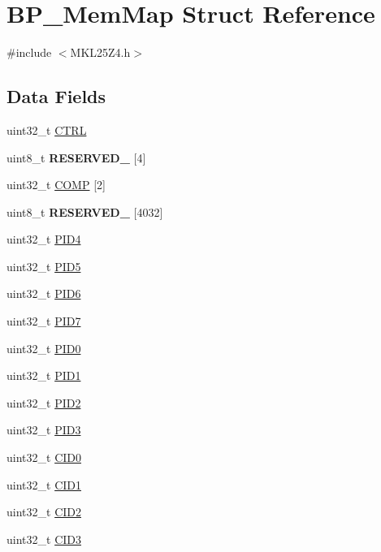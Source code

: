 \hypertarget{struct_b_p___mem_map}{}\section{B\+P\+\_\+\+Mem\+Map Struct Reference}
\label{struct_b_p___mem_map}


{\ttfamily \#include $<$M\+K\+L25\+Z4.\+h$>$}

\subsection*{Data Fields}
\begin{DoxyCompactItemize}
\item 
uint32\+\_\+t \hyperlink{struct_b_p___mem_map_a3be6514ca3bd369fd0de9f8f49471179}{C\+T\+R\+L}
\item 
\hypertarget{struct_b_p___mem_map_a71277aaa40be4473ac2521981f273bd3}{}uint8\+\_\+t {\bfseries R\+E\+S\+E\+R\+V\+E\+D\+\_} \mbox{[}4\mbox{]}\label{struct_b_p___mem_map_a71277aaa40be4473ac2521981f273bd3}

\item 
uint32\+\_\+t \hyperlink{struct_b_p___mem_map_afb7d1b290d30b9254c6975be8cfafbd7}{C\+O\+M\+P} \mbox{[}2\mbox{]}
\item 
\hypertarget{struct_b_p___mem_map_ac9276921ef84716eb43e5be528cf04e3}{}uint8\+\_\+t {\bfseries R\+E\+S\+E\+R\+V\+E\+D\+\_} \mbox{[}4032\mbox{]}\label{struct_b_p___mem_map_ac9276921ef84716eb43e5be528cf04e3}

\item 
uint32\+\_\+t \hyperlink{struct_b_p___mem_map_a4b742da36aa92236a876883d225769d9}{P\+I\+D4}
\item 
uint32\+\_\+t \hyperlink{struct_b_p___mem_map_a89a2228208ede3f7821c62acc24817e7}{P\+I\+D5}
\item 
uint32\+\_\+t \hyperlink{struct_b_p___mem_map_afbf6d9cf2860db9747fe2490f0a52bc9}{P\+I\+D6}
\item 
uint32\+\_\+t \hyperlink{struct_b_p___mem_map_a1658a67c3a52064ae611268d27ed5159}{P\+I\+D7}
\item 
uint32\+\_\+t \hyperlink{struct_b_p___mem_map_a769a58cfc13da35629a0e87f06abf754}{P\+I\+D0}
\item 
uint32\+\_\+t \hyperlink{struct_b_p___mem_map_a6e66209ba976b8d677c86ee05f0ee2fa}{P\+I\+D1}
\item 
uint32\+\_\+t \hyperlink{struct_b_p___mem_map_a8c56863ae2fd45dbee06b0ba0c7c17c7}{P\+I\+D2}
\item 
uint32\+\_\+t \hyperlink{struct_b_p___mem_map_acf224ed0d83cc1ae7b8492c6cd79e5dd}{P\+I\+D3}
\item 
uint32\+\_\+t \hyperlink{struct_b_p___mem_map_a46667149a1f5fa643ce1b5e7d55d85fb}{C\+I\+D0}
\item 
uint32\+\_\+t \hyperlink{struct_b_p___mem_map_afafacc56ceb45f360e2f940ee6b00467}{C\+I\+D1}
\item 
uint32\+\_\+t \hyperlink{struct_b_p___mem_map_a3451ba8427632b30ce7bbaf9e9aa37a4}{C\+I\+D2}
\item 
uint32\+\_\+t \hyperlink{struct_b_p___mem_map_aea4c61492fd7567bc47e9a5eaf95ca58}{C\+I\+D3}
\end{DoxyCompactItemize}


